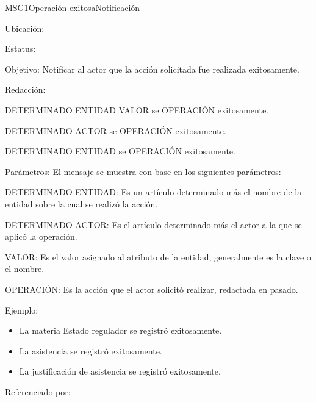 \begin{mensaje}{MSG1}{Operación exitosa}{Notificación}
	\item[Ubicación:] \msjSuperior
	\item[Estatus:] %
	\item[Objetivo:] Notificar al actor que la acción solicitada fue realizada exitosamente.
	\item[Redacción:]
	\begin{Citemize}
		\item
		DETERMINADO ENTIDAD VALOR se OPERACIÓN exitosamente.
		\item
		DETERMINADO ACTOR se OPERACIÓN exitosamente.
		\item
		DETERMINADO ENTIDAD se OPERACIÓN exitosamente.
	\end{Citemize}
	\item[Parámetros:] El mensaje se muestra con base en los siguientes parámetros:
	\begin{Citemize}
		\item DETERMINADO ENTIDAD: Es un artículo determinado más el nombre de la entidad sobre la cual se realizó la acción.
		\item DETERMINADO ACTOR: Es el artículo determinado más el actor a la que se aplicó la operación.
		\item VALOR: Es el valor asignado al atributo de la entidad, generalmente es la clave o el nombre.
		\item OPERACIÓN: Es la acción que el actor solicitó realizar, redactada en pasado.
	\end{Citemize}
	\item[Ejemplo:] 
	\begin{itemize}
		\item La materia Estado regulador se registró exitosamente.
		\item La asistencia se registró exitosamente.
		\item La justificación de asistencia se registró exitosamente. 
	\end{itemize}
	

	\item[Referenciado por:]
\end{mensaje}

